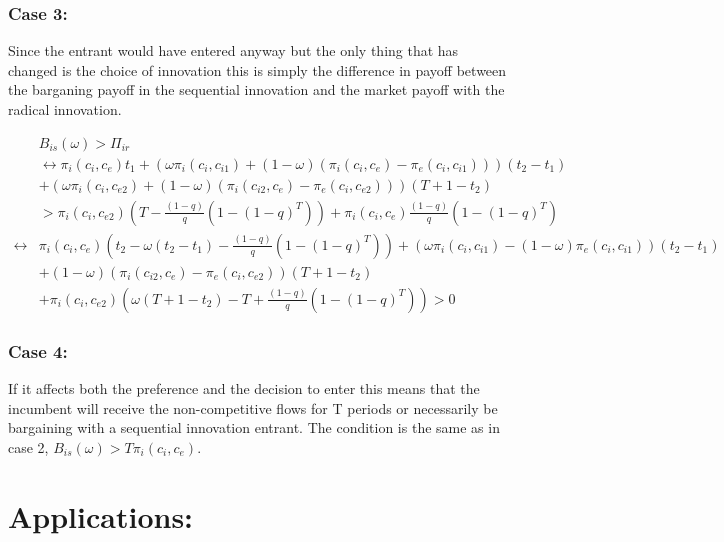 \documentclass[11pt]{article}
\begin{document}
\subsubsection{Case 3:}

Since the entrant would have entered anyway but the only thing that has changed is the choice of innovation this is simply the difference in payoff between the barganing payoff in the sequential innovation and the market payoff with the radical innovation. 

\begin{align*}
&B_{is}(\omega)>\Pi_{ir}
\\
& \leftrightarrow \pi_i(c_i,c_{e})t_1 
+(\omega \pi_i(c_i,c_{i1})+(1-\omega)(\pi_i(c_i,c_{e})-\pi_e(c_i,c_{i1})))(t_2-t_1)
\\&+(\omega \pi_i(c_i,c_{e2})+(1-\omega)(\pi_i(c_{i2},c_e)-\pi_e(c_{i},c_{e2})))(T+1-t_2)  \\
&> \pi_{i}(c_i,c_{e2}) \left( T - \frac{(1-q)}{q} \left( 1-(1-q)^T \right) \right)
+\pi_i(c_i,c_e) \frac{(1-q)}{q} \left( 1-(1-q)^T \right) \\
\leftrightarrow &\pi_i(c_i,c_e)(t_2 -\omega(t_2-t_1)-\frac{(1-q)}{q} \left( 1-(1-q)^T \right)) 
+(\omega \pi_i(c_i,c_{i1})-(1-\omega)\pi_e(c_i,c_{i1}))(t_2-t_1) \\
& +(1-\omega)(\pi_i(c_{i2},c_e)-\pi_e(c_{i},c_{e2}))(T+1-t_2) \\
&+ \pi_i(c_{i},c_{e2})\left(\omega(T+1-t_2)-T+\frac{(1-q)}{q} \left( 1-(1-q)^T \right)\right)
> 0
\end{align*}

\subsubsection{Case 4:}

If it affects both the preference and the decision to enter this means that the incumbent will receive the non-competitive flows for T periods or necessarily be bargaining with a sequential innovation entrant. The condition is the same as in case 2, $ B_{is}(\omega)>T \pi_i(c_i,c_e)$.

\section{Applications:}
\end{document}
